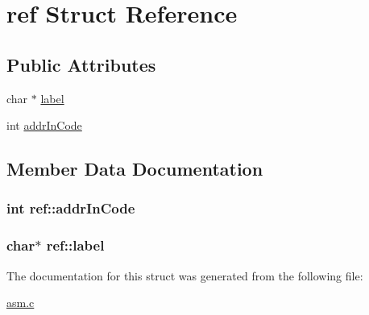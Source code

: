 \hypertarget{structref}{}\section{ref Struct Reference}
\label{structref}
\subsection*{Public Attributes}
\begin{DoxyCompactItemize}
\item 
char $\ast$ \hyperlink{structref_a1f034634ee71b9c4421efe009de3a159}{label}
\item 
int \hyperlink{structref_aab92a178c6f40703ef8a5a18cc2ba81d}{addr\+In\+Code}
\end{DoxyCompactItemize}


\subsection{Member Data Documentation}
\subsubsection[{\texorpdfstring{addr\+In\+Code}{addrInCode}}]{\setlength{\rightskip}{0pt plus 5cm}int ref\+::addr\+In\+Code}\hypertarget{structref_aab92a178c6f40703ef8a5a18cc2ba81d}{}\label{structref_aab92a178c6f40703ef8a5a18cc2ba81d}
\subsubsection[{\texorpdfstring{label}{label}}]{\setlength{\rightskip}{0pt plus 5cm}char$\ast$ ref\+::label}\hypertarget{structref_a1f034634ee71b9c4421efe009de3a159}{}\label{structref_a1f034634ee71b9c4421efe009de3a159}


The documentation for this struct was generated from the following file\+:\begin{DoxyCompactItemize}
\item 
\hyperlink{asm_8c}{asm.\+c}\end{DoxyCompactItemize}
